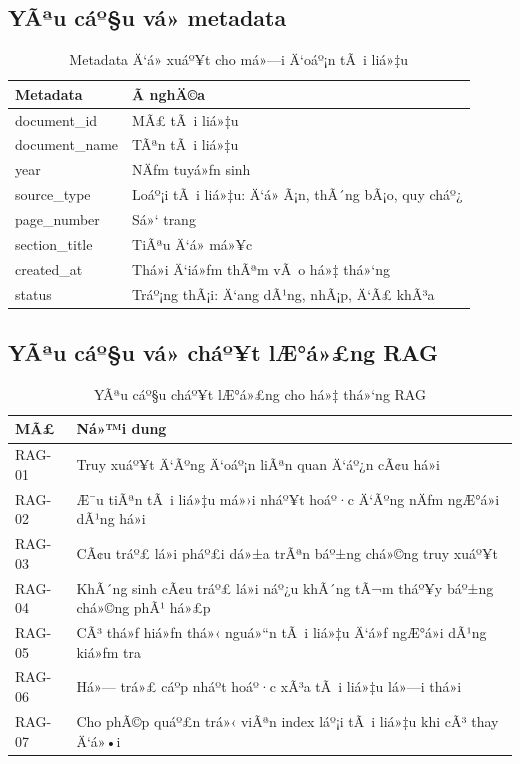﻿\documentclass[12pt,a4paper]{report}
\begin{document}
\subsection{YÃªu cáº§u vá» metadata}
\begin{table}[H]
\centering
\caption{Metadata Ä‘á» xuáº¥t cho má»—i Ä‘oáº¡n tÃ i liá»‡u}
\label{tab:rag_metadata}
\begin{tabular}{|p{3.6cm}|p{8.4cm}|}
\hline
\textbf{Metadata} & \textbf{Ã nghÄ©a} \\ \hline
document\_id & MÃ£ tÃ i liá»‡u \\ \hline
document\_name & TÃªn tÃ i liá»‡u \\ \hline
year & NÄƒm tuyá»ƒn sinh \\ \hline
source\_type & Loáº¡i tÃ i liá»‡u: Ä‘á» Ã¡n, thÃ´ng bÃ¡o, quy cháº¿ \\ \hline
page\_number & Sá»‘ trang \\ \hline
section\_title & TiÃªu Ä‘á» má»¥c \\ \hline
created\_at & Thá»i Ä‘iá»ƒm thÃªm vÃ o há»‡ thá»‘ng \\ \hline
status & Tráº¡ng thÃ¡i: Ä‘ang dÃ¹ng, nhÃ¡p, Ä‘Ã£ khÃ³a \\ \hline
\end{tabular}
\end{table}

\subsection{YÃªu cáº§u vá» cháº¥t lÆ°á»£ng RAG}
\begin{table}[H]
\centering
\caption{YÃªu cáº§u cháº¥t lÆ°á»£ng cho há»‡ thá»‘ng RAG}
\label{tab:rag_quality}
\begin{tabular}{|p{2.2cm}|p{9.8cm}|}
\hline
\textbf{MÃ£} & \textbf{Ná»™i dung} \\ \hline
RAG-01 & Truy xuáº¥t Ä‘Ãºng Ä‘oáº¡n liÃªn quan Ä‘áº¿n cÃ¢u há»i \\ \hline
RAG-02 & Æ¯u tiÃªn tÃ i liá»‡u má»›i nháº¥t hoáº·c Ä‘Ãºng nÄƒm ngÆ°á»i dÃ¹ng há»i \\ \hline
RAG-03 & CÃ¢u tráº£ lá»i pháº£i dá»±a trÃªn báº±ng chá»©ng truy xuáº¥t \\ \hline
RAG-04 & KhÃ´ng sinh cÃ¢u tráº£ lá»i náº¿u khÃ´ng tÃ¬m tháº¥y báº±ng chá»©ng phÃ¹ há»£p \\ \hline
RAG-05 & CÃ³ thá»ƒ hiá»ƒn thá»‹ nguá»“n tÃ i liá»‡u Ä‘á»ƒ ngÆ°á»i dÃ¹ng kiá»ƒm tra \\ \hline
RAG-06 & Há»— trá»£ cáº­p nháº­t hoáº·c xÃ³a tÃ i liá»‡u lá»—i thá»i \\ \hline
RAG-07 & Cho phÃ©p quáº£n trá»‹ viÃªn index láº¡i tÃ i liá»‡u khi cÃ³ thay Ä‘á»•i \\ \hline
\end{tabular}
\end{table}
\end{document}
